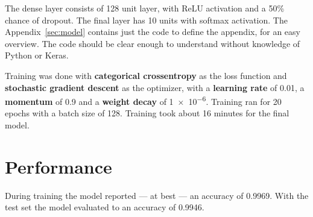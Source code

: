 The dense layer consists of 128 unit layer, with ReLU activation and a
\num{50}\% chance of dropout. The final layer has 10 units with softmax
activation. The Appendix~\ref{sec:model} contains just the code to define the
appendix, for an easy overview. The code should be clear enough to understand
without knowledge of Python or Keras.

Training was done with \textbf{categorical crossentropy} as the loss function
and \textbf{stochastic gradient descent} as the optimizer, with a
\textbf{learning rate} of \num{0.01}, a \textbf{momentum} of \num{0.9} and a
\textbf{weight decay} of \num{1e-6}. Training ran for \num{20} epochs with a
batch size of \num{128}. Training took about \num{16} minutes for the final
model.

\section{Performance}

During training the model reported --- at best --- an accuracy of \num{0.9969}.
With the test set the model evaluated to an accuracy of \num{0.9946}.

\appendix

